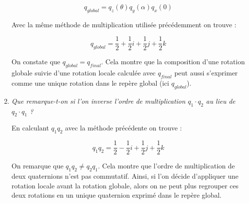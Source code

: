 \documentclass[a4paper,12pt]{article}
\begin{document}
\begin{enumerate}
            \[ q_{global} = q_{z}(\theta) q_{y}(\alpha) q_{x}(0) \]

            Avec la même méthode de multiplication utilisée précédemment on trouve :

            \[ q_{global} = \boxed{\frac{1}{2} + \frac{1}{2}i + \frac{1}{2}j + \frac{1}{2}k} \]

            On constate que \(q_{global} = q_{final}\). Cela montre que la composition d'une rotation globale suivie d'une rotation locale calculée avec \(q_{final}\) peut aussi s'exprimer comme une unique rotation dans le repère global (ici \(q_{global}\)).

          \newpage \item \emph{Que remarque-t-on si l’on inverse l’ordre de multiplication \( q_1 \cdot q_2 \) au lieu de \( q_2 \cdot q_1 \) ?}

            En calculant \(q_1 q_2\) avec la méthode précédente on trouve :

            \[
              q_1 q_2 = \boxed{\frac{1}{2} -\frac{1}{2}i + \frac{1}{2}j + \frac{1}{2}k}
            \]

            On remarque que \(q_1 q_2 \neq q_2 q_1\). Cela montre que l'ordre de multiplication de deux quaternions n'est pas commutatif.
            Ainsi, si l’on décide d’appliquer une rotation locale avant la rotation globale, alors on ne peut plus regrouper ces deux rotations en un unique quaternion exprimé dans le repère global. 


\end{enumerate}
\end{document}
